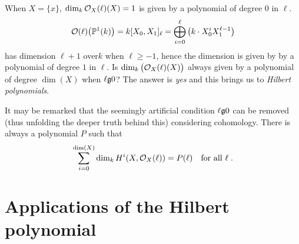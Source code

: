\documentclass[a4paper,parskip=half,numbers=enddot, DIV=12]{scrreprt}
\begin{document}
\begin{rem*}
    When $X=\{x\}$, $\dim_k \mathcal{O}_X(\ell)(X) = 1$ is given by a polynomial of degree $0$ in $\ell$. 
    \begin{align*}
        \mathcal{O}(\ell)\big(\mathbb{P}^1(k)\big) = k[X_0,X_1]_\ell=\bigoplus_{i=0}^\ell \left(k\cdot X_0^iX_1^{\ell-1}\right)
    \end{align*}
    has dimension $\ell+1$ over$k$ when $\ell\geq -1$, hence the dimension is given by by a polynomial of degree $1$ in $\ell$. Is $\dim_k\big(\mathcal{O}_X(\ell)(X)\big)$ always given by a polynomial of degree $\dim(X)$ when $\ell \gge 0$? The answer is \emph{yes} and this brings us to \emph{Hilbert polynomials}.
    
    It may be remarked that the seemingly artificial condition $\ell\gge0$ can be removed (thus unfolding the deeper truth behind this) considering cohomology. There is always a polynomial $P$ such that 
    \begin{align*}
	    \sum_{i=0}^{\dim (X)} \dim_kH^i(X,\mathcal{O}_X(\ell)) = P(\ell)\quad\text{for all }\ell\;.
    \end{align*}
\end{rem*}



\chapter{Applications of the Hilbert polynomial}
\end{document}
